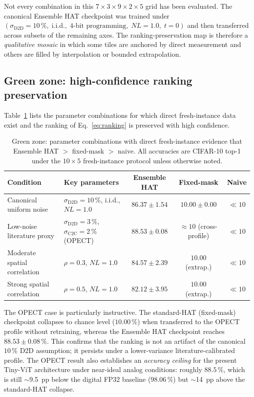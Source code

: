Not every combination in this $7 \times 3 \times 9 \times 2 \times 5$ grid has been evaluated.  The canonical Ensemble HAT checkpoint was trained under $(\sigma_{\mathrm{D2D}}=10\,\%,\; \text{i.i.d.},\; 4\text{-bit programming},\; NL=1.0,\; t=0)$ and then transferred across subsets of the remaining axes.  The ranking-preservation map is therefore a \emph{qualitative mosaic} in which some tiles are anchored by direct measurement and others are filled by interpolation or bounded extrapolation.

\subsection{Green zone: high-confidence ranking preservation}

Table~\ref{tab:green-zone} lists the parameter combinations for which direct fresh-instance data exist and the ranking of Eq.~\ref{eq:ranking} is preserved with high confidence.

\begin{table}[t]
    \centering
    \caption{Green zone: parameter combinations with direct fresh-instance evidence that Ensemble HAT $>$ fixed-mask $>$ naive.  All accuracies are CIFAR-10 top-1 under the $10 \times 5$ fresh-instance protocol unless otherwise noted.}
    \label{tab:green-zone}
    \small
    \begin{tabular}{@{}llccc@{}}
        \toprule
        \textbf{Condition} & \textbf{Key parameters} & \textbf{Ensemble HAT} & \textbf{Fixed-mask} & \textbf{Naive} \\
        \midrule
        Canonical uniform noise & $\sigma_{\mathrm{D2D}}=10\,\%$, i.i.d., $NL=1.0$ & $86.37\pm1.54$ & $10.00\pm0.00$ & $\ll 10$ \\
        Low-noise literature proxy & $\sigma_{\mathrm{D2D}}=3\,\%$, $\sigma_{\mathrm{C2C}}=2\,\%$ (OPECT) & $88.53\pm0.08$ & $\approx 10$ (cross-profile) & $\ll 10$ \\
        Moderate spatial correlation & $\rho=0.3$, $NL=1.0$ & $84.57\pm2.39$ & $10.00$ (extrap.) & $\ll 10$ \\
        Strong spatial correlation & $\rho=0.5$, $NL=1.0$ & $82.12\pm3.95$ & $10.00$ (extrap.) & $\ll 10$ \\
        \bottomrule
    \end{tabular}
\end{table}

The OPECT case is particularly instructive.  The standard-HAT (fixed-mask) checkpoint collapses to chance level ($10.00\,\%$) when transferred to the OPECT profile without retraining, whereas the Ensemble HAT checkpoint reaches $88.53\pm0.08\,\%$.  This confirms that the ranking is not an artifact of the canonical $10\,\%$ D2D assumption; it persists under a lower-variance literature-calibrated profile.  The OPECT result also establishes an \emph{accuracy ceiling} for the present Tiny-ViT architecture under near-ideal analog conditions: roughly $88.5\,\%$, which is still $\sim$9.5~pp below the digital FP32 baseline ($98.06\,\%$) but $\sim$14~pp above the standard-HAT collapse.

